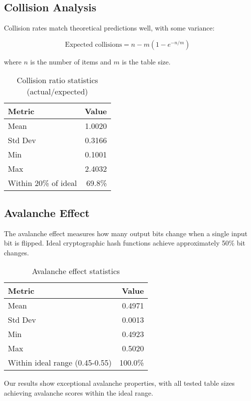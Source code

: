 \documentclass[11pt,a4paper]{article}
\theoremstyle{definition}
\begin{document}
\subsection{Collision Analysis}

Collision rates match theoretical predictions well, with some variance:

$$\text{Expected collisions} = n - m\left(1 - e^{-n/m}\right)$$

where $n$ is the number of items and $m$ is the table size.

\begin{table}[h]
\centering
\caption{Collision ratio statistics (actual/expected)}
\begin{tabular}{@{}lr@{}}
\toprule
Metric & Value \\
\midrule
Mean & 1.0020 \\
Std Dev & 0.3166 \\
Min & 0.1001 \\
Max & 2.4032 \\
Within 20\% of ideal & 69.8\% \\
\bottomrule
\end{tabular}
\end{table}

\subsection{Avalanche Effect}

The avalanche effect measures how many output bits change when a single input bit is flipped. Ideal cryptographic hash functions achieve approximately 50\% bit changes.

\begin{table}[h]
\centering
\caption{Avalanche effect statistics}
\begin{tabular}{@{}lr@{}}
\toprule
Metric & Value \\
\midrule
Mean & 0.4971 \\
Std Dev & 0.0013 \\
Min & 0.4923 \\
Max & 0.5020 \\
Within ideal range (0.45-0.55) & 100.0\% \\
\bottomrule
\end{tabular}
\end{table}

Our results show exceptional avalanche properties, with all tested table sizes achieving avalanche scores within the ideal range.
\end{document}
